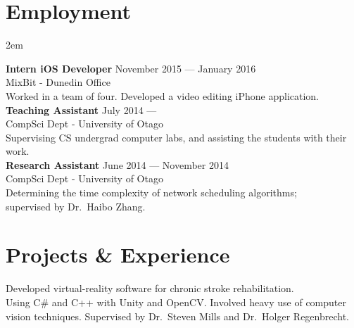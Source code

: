 \documentclass[a4paper, oneside, final]{scrartcl}
\begin{document}
	\section{Employment}
    
    \begingroup\leftskip2em
       
   	\noindent	
    \textbf{Intern iOS Developer} \hfill November 2015 --- January 2016 \\
	MixBit - Dunedin Office \\
	Worked in a team of four. Developed a video editing iPhone application. \\
       
	\noindent	
    \textbf{Teaching Assistant} \hfill July 2014 --- \\
	CompSci Dept - University of Otago \\
	Supervising CS undergrad computer labs, and assisting the students with their work. \\
    
    \noindent
    \textbf{Research Assistant} \hfill June 2014 --- November 2014 \hfill \\
    CompSci Dept - University of Otago \\
	Determining the time complexity of network scheduling algorithms;\\ supervised by Dr.\ Haibo Zhang.\\
    \endgroup
    
	\section{Projects \& Experience}
    
    \noindent        
	Developed virtual-reality software for chronic stroke rehabilitation.\\
	Using C\# and C++ with Unity and OpenCV. Involved heavy use of computer\\ vision techniques. Supervised by Dr.\ Steven Mills and Dr.\ Holger Regenbrecht.\\
    
\end{document}
